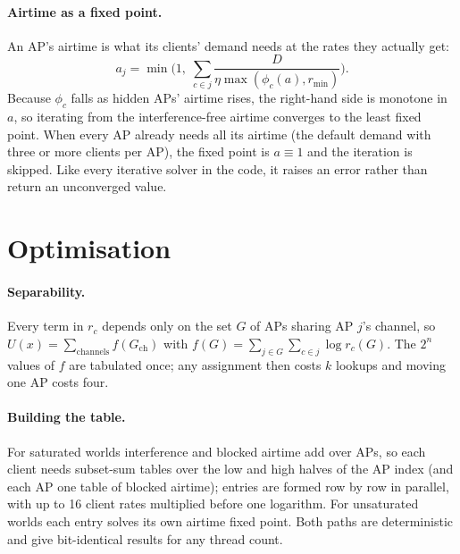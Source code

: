 \documentclass[10pt]{article}
\begin{document}
\paragraph{Airtime as a fixed point.}
An AP's airtime is what its clients' demand needs at the rates they actually get:
\[
  a_j = \min\!\Big(1,\; \sum_{c \in j} \frac{D}{\eta \max(\phi_c(a), r_{\min})}\Big).
\]
Because $\phi_c$ falls as hidden APs' airtime rises, the right-hand side is monotone in $a$, so iterating from the
interference-free airtime converges to the least fixed point. When every AP already needs all its airtime (the default
demand with three or more clients per AP), the fixed point is $a \equiv 1$ and the iteration is skipped. Like every
iterative solver in the code, it raises an error rather than return an unconverged value.

\section{Optimisation}

\paragraph{Separability.}
Every term in $r_c$ depends only on the set $G$ of APs sharing AP $j$'s channel, so
$U(x) = \sum_{\text{channels}} f(G_{\text{ch}})$ with $f(G) = \sum_{j \in G} \sum_{c \in j} \log r_c(G)$. The $2^n$ values of
$f$ are tabulated once; any assignment then costs $k$ lookups and moving one AP costs four.

\paragraph{Building the table.}
For saturated worlds interference and blocked airtime add over APs, so each client needs subset-sum tables over the low
and high halves of the AP index (and each AP one table of blocked airtime); entries are formed row by row in parallel,
with up to 16 client rates multiplied before one logarithm. For unsaturated worlds each entry solves its own airtime
fixed point. Both paths are deterministic and give bit-identical results for any thread count.
\end{document}
